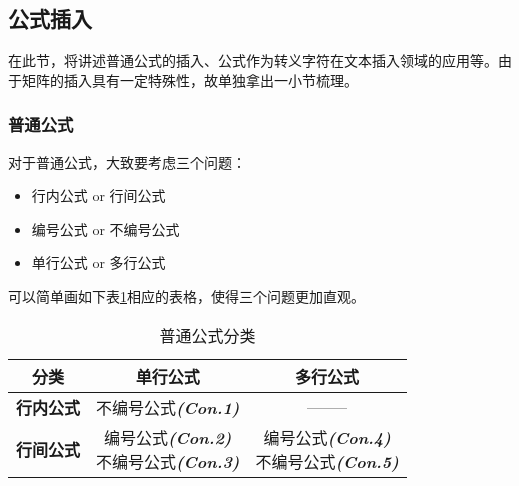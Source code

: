 \documentclass{article}
\begin{document}
		\subsection{公式插入}
		在此节，将讲述普通公式的插入、公式作为转义字符在文本插入领域的应用等。由于矩阵的插入具有一定特殊性，故单独拿出一小节梳理。
			\subsubsection{普通公式}
			对于普通公式，大致要考虑三个问题：
				\begin{itemize}
					\item 行内公式 or 行间公式 
					\item 编号公式 or 不编号公式 
					\item 单行公式 or 多行公式
				\end{itemize}
			可以简单画如下表\ref{table4}相应的表格，使得三个问题更加直观。
				\begin{table}[H]
					\centering
					\caption{普通公式分类}
					\setlength{\tabcolsep}{20pt}
					\begin{tabular}{c|cc}
						\toprule
							分类 & \textbf{单行公式} & \textbf{多行公式} \\
						\midrule
							\textbf{行内公式} & 不编号公式\textbf{\textit{(Con.1)}} & -------- \\
						\hline
							\textbf{行间公式} & \makecell[c]{编号公式\textbf{\textit{(Con.2)}} \\ 不编号公式\textbf{\textit{(Con.3)}}} & \makecell[c]{编号公式\textbf{\textit{(Con.4)}} \\ 不编号公式\textbf{\textit{(Con.5)}}} \\
						\bottomrule
					\end{tabular}
					\label{table4}
				\end{table}
				
\end{document}
